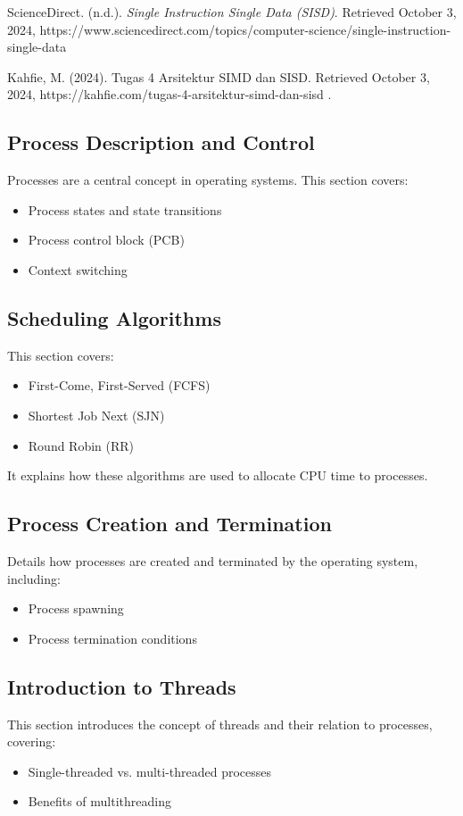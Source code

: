 \documentclass[12pt]{article}
\begin{document}
\begin{thebibliography}{9} 

 ScienceDirect. (n.d.). \textit{Single Instruction Single Data (SISD)}. Retrieved October 3, 2024, https://www.sciencedirect.com/topics/computer-science/single-instruction-single-data

 Kahfie, M. (2024). Tugas 4 Arsitektur SIMD dan SISD. Retrieved October 3, 2024, https://kahfie.com/tugas-4-arsitektur-simd-dan-sisd
.

\end{thebibliography}

\subsection{Process Description and Control}
Processes are a central concept in operating systems. This section covers:
\begin{itemize}
    \item Process states and state transitions
    \item Process control block (PCB)
    \item Context switching
\end{itemize}

\subsection{Scheduling Algorithms}
This section covers:
\begin{itemize}
    \item First-Come, First-Served (FCFS)
    \item Shortest Job Next (SJN)
    \item Round Robin (RR)
\end{itemize}
It explains how these algorithms are used to allocate CPU time to processes.

\subsection{Process Creation and Termination}
Details how processes are created and terminated by the operating system, including:
\begin{itemize}
    \item Process spawning
    \item Process termination conditions
\end{itemize}

\subsection{Introduction to Threads}
This section introduces the concept of threads and their relation to processes, covering:
\begin{itemize}
    \item Single-threaded vs. multi-threaded processes
    \item Benefits of multithreading
\end{itemize}
\end{document}
